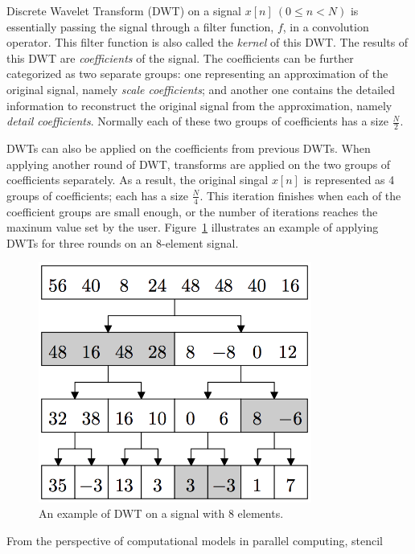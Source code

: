 Discrete Wavelet Transform (DWT) on a signal $x[n] \: (0 \leq n < N)$ is essentially
passing the signal through a filter function, $f$, 
in a convolution operator.
%
This filter function is also called the \textit{kernel} of this DWT.
%
The results of this DWT are \textit{coefficients} of the signal.
%
The coefficients can be further categorized as two separate groups: 
one representing an approximation of the original signal,
namely \textit{scale coefficients};
and another one contains the detailed information to reconstruct
the original signal from the approximation, namely 
\textit{detail coefficients}.
%
Normally each of these two groups of coefficients has a size $\frac{N}{2}$.


DWTs can also be applied on the coefficients from previous DWTs.
%
When applying another round of DWT, transforms are applied on the two
groups of coefficients separately.
%
As a result, the original singal $x[n]$ is represented as 4 groups of 
coefficients; each has a size $\frac{N}{4}$.
%
This iteration finishes when each of the coefficient groups are small enough,
or the number of iterations reaches the maxinum value set by the user. 
%
%
%
Figure~\ref{fig:example1} illustrates an example of applying DWTs for 
three rounds on an 8-element signal.



\begin{figure}[p]
    \centering
    \includegraphics[width=0.8\textwidth]{fig/example1.png}
    \caption{An example of DWT on a signal with 8 elements.}
    \label{fig:example1}
\end{figure}



From the perspective of computational models in parallel computing, 
stencil


